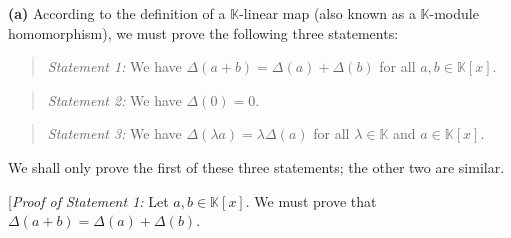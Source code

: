 \documentclass[paper=a4, fontsize=12pt]{scrartcl}%
\theoremstyle{plainsl}
\theoremstyle{definition}
\theoremstyle{remark}
\newenvironment{statement}{\begin{quote}}{\end{quote}}
\begin{document}
\bigskip

\textbf{(a)} According to the definition of a $\mathbb{K}$-linear map (also
known as a $\mathbb{K}$-module homomorphism), we must prove the following
three statements:

\begin{statement}
\textit{Statement 1:} We have $\Delta\left(  a+b\right)  =\Delta\left(
a\right)  +\Delta\left(  b\right)  $ for all $a,b\in\mathbb{K}\left[
x\right]  $.
\end{statement}

\begin{statement}
\textit{Statement 2:} We have $\Delta\left(  0\right)  =0$.
\end{statement}

\begin{statement}
\textit{Statement 3:} We have $\Delta\left(  \lambda a\right)  =\lambda
\Delta\left(  a\right)  $ for all $\lambda\in\mathbb{K}$ and $a\in
\mathbb{K}\left[  x\right]  $.
\end{statement}

We shall only prove the first of these three statements; the other two are similar.

[\textit{Proof of Statement 1:} Let $a,b\in\mathbb{K}\left[  x\right]  $. We
must prove that $\Delta\left(  a+b\right)  =\Delta\left(  a\right)
+\Delta\left(  b\right)  $.
\end{document}
